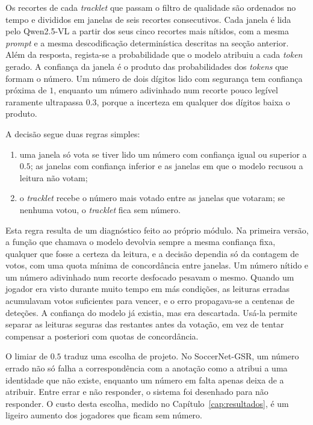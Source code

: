 Os recortes de cada \emph{tracklet} que passam o filtro de qualidade são ordenados no tempo e
divididos em janelas de seis recortes consecutivos. Cada janela é lida pelo Qwen2.5-VL a partir
dos seus cinco recortes mais nítidos, com a mesma \emph{prompt} e a mesma descodificação
determinística descritas na secção anterior. Além da resposta, regista-se a probabilidade que o
modelo atribuiu a cada \emph{token} gerado. A confiança da janela é o produto das probabilidades
dos \emph{tokens} que formam o número. Um número de dois dígitos lido com segurança tem confiança
próxima de $1$, enquanto um número adivinhado num recorte pouco legível raramente ultrapassa
$0.3$, porque a incerteza em qualquer dos dígitos baixa o produto.

A decisão segue duas regras simples:
\begin{enumerate}
    \item uma janela só vota se tiver lido um número com confiança igual ou superior a $0.5$; as
    janelas com confiança inferior e as janelas em que o modelo recusou a leitura não votam;
    \item o \emph{tracklet} recebe o número mais votado entre as janelas que votaram; se nenhuma
    votou, o \emph{tracklet} fica sem número.
\end{enumerate}

Esta regra resulta de um diagnóstico feito ao próprio módulo. Na primeira versão, a função que
chamava o modelo devolvia sempre a mesma confiança fixa, qualquer que fosse a certeza da leitura,
e a decisão dependia só da contagem de votos, com uma quota mínima de concordância entre janelas.
Um número nítido e um número adivinhado num recorte desfocado pesavam o mesmo. Quando um jogador
era visto durante muito tempo em más condições, as leituras erradas acumulavam votos suficientes
para vencer, e o erro propagava-se a centenas de deteções. A confiança do modelo já existia, mas
era descartada. Usá-la permite separar as leituras seguras das restantes antes da votação, em vez
de tentar compensar a posteriori com quotas de concordância.

O limiar de $0.5$ traduz uma escolha de projeto. No SoccerNet-GSR, um número errado não só falha a
correspondência com a anotação como a atribui a uma identidade que não existe, enquanto um número
em falta apenas deixa de a atribuir. Entre errar e não responder, o sistema foi desenhado para não
responder. O custo desta escolha, medido no Capítulo~\ref{cap:resultados}, é um ligeiro aumento dos
jogadores que ficam sem número.


